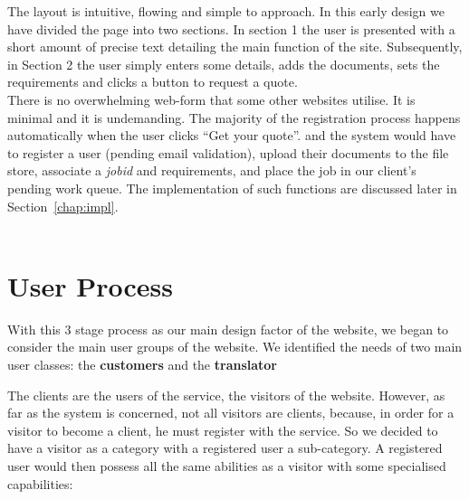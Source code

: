 \documentclass{l3proj}
\begin{document}
The layout is intuitive, flowing and simple to approach. In this early design we
have divided the page into two sections. In section 1 the user is presented with
a short amount of precise text detailing the main function of the site.
Subsequently, in Section 2 the user simply enters some details, adds the
documents, sets the requirements and clicks a button to request a quote. \\There
is no overwhelming web-form that some other websites utilise. It is minimal and
it is undemanding. The majority of the registration process happens
automatically when the user clicks ``Get your quote''. and the system would have
to register a user (pending email validation), upload their documents to the
file store, associate a \textit{jobid} and requirements, and place the job in
our client's pending work queue. The implementation of such functions are
discussed later in Section~\ref{chap:impl}.\\
\\


\section{User Process}
\label{sect:user-process}
With this 3 stage process as our main design factor of the website, we began to
consider the main user groups of the website. We identified the needs of two
main user classes: the \textbf{customers} and the \textbf{translator}

The clients are the users of the service, the visitors of the website. However,
as far as the system is concerned, not all visitors are clients, because, in
order for a visitor to become a client, he must register with the service. So we
decided to have a visitor as a category with a registered user a sub-category. A
registered user would then possess all the same abilities as a visitor with some
specialised capabilities:
\end{document}
